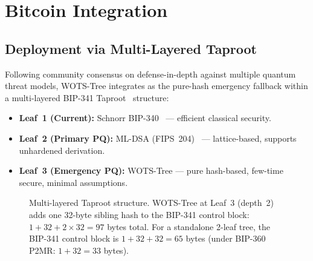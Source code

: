 \documentclass[11pt,a4paper]{article}
\theoremstyle{definition}
\begin{document}
\section{Bitcoin Integration}
\label{sec:bitcoin}

\subsection{Deployment via Multi-Layered Taproot}
\label{sec:taproot}

Following community consensus on defense-in-depth against multiple quantum threat models, WOTS-Tree integrates as the pure-hash emergency fallback within a multi-layered BIP-341 Taproot~\cite{bip341} structure:

\begin{itemize}[nosep]
    \item \textbf{Leaf~1 (Current):} Schnorr BIP-340~\cite{bip340} --- efficient classical security.
    \item \textbf{Leaf~2 (Primary PQ):} ML-DSA (FIPS~204)~\cite{nist2024mldsa} --- lattice-based, supports unhardened derivation.
    \item \textbf{Leaf~3 (Emergency PQ):} WOTS-Tree --- pure hash-based, few-time secure, minimal assumptions.
\end{itemize}

\begin{figure}[h]
\centering
{}
\caption{Multi-layered Taproot structure. WOTS-Tree at Leaf~3 (depth~2) adds one 32-byte sibling hash to the BIP-341 control block: $1 + 32 + 2 \times 32 = 97$ bytes total. For a standalone 2-leaf tree, the BIP-341 control block is $1 + 32 + 32 = 65$ bytes (under BIP-360 P2MR: $1 + 32 = 33$ bytes).}
\label{fig:taproot}
\end{figure}
\end{document}
